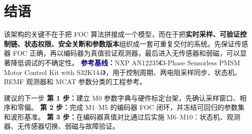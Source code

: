\documentclass[UTF8,a4paper,11pt,fontset=windows]{ctexart}
\begin{document}
\section{结语}
该架构的关键不在于把 FOC 算法拼接成一个模型，而在于把\textbf{实时采样、可验证控制链、状态权限、安全关断和参数版本}组织成一套可重复交付的系统。先保证传感器 FOC 正确，再以编码器为真值验证观测器，最后进入无传感器和弱磁，可以显著降低调试的不确定性。
\vspace{1em}
\noindent\textcolor{navy}{\bfseries 参考基线：}NXP AN12235《3-Phase Sensorless PMSM Motor Control Kit with S32K144》，用于控制周期、两电阻采样同步、状态机、BEMF 观测器和 MCAT 参数分类的工程参考。
\vspace{1em}
\begin{keybox}{建议的下一步}
\textbf{第 1 步：}建立 M0 参数字典与硬件标定台架，先确认采样窗口、相序和零偏。\quad
\textbf{第 2 步：}完成 M1--M5 的编码器 FOC 闭环，并冻结可回归的参数集和波形基准。\quad
\textbf{第 3 步：}在编码器真值对比通过后实施 M6--M10：状态机、观测器、无传感器切换、弱磁与故障验证。
\end{keybox}
\end{document}
